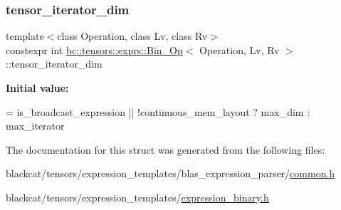 \subsubsection{\texorpdfstring{tensor\+\_\+iterator\+\_\+dim}{tensor\_iterator\_dim}}
{\footnotesize\ttfamily template$<$class Operation, class Lv, class Rv$>$ \\
constexpr int \hyperlink{structbc_1_1tensors_1_1exprs_1_1Bin__Op}{bc\+::tensors\+::exprs\+::\+Bin\+\_\+\+Op}$<$ Operation, Lv, Rv $>$\+::tensor\+\_\+iterator\+\_\+dim\hspace{0.3cm}{\ttfamily [static]}}

{\bfseries Initial value\+:}
\begin{DoxyCode}
=
        is\_broadcast\_expression || !continuous\_mem\_layout ?
            max\_dim :
            max\_iterator
\end{DoxyCode}


The documentation for this struct was generated from the following files\+:\begin{DoxyCompactItemize}
\item 
blackcat/tensors/expression\+\_\+templates/blas\+\_\+expression\+\_\+parser/\hyperlink{tensors_2expression__templates_2blas__expression__parser_2common_8h}{common.\+h}\item 
blackcat/tensors/expression\+\_\+templates/\hyperlink{expression__binary_8h}{expression\+\_\+binary.\+h}\end{DoxyCompactItemize}
